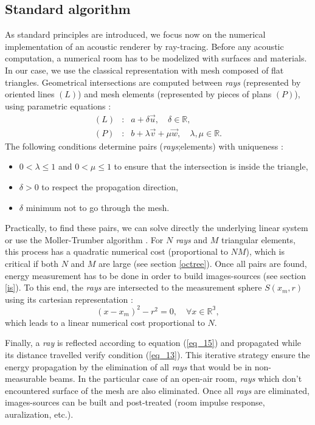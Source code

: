 \documentclass[AMA,STIX1COL]{WileyNJD-v2}
\begin{document}
\subsection{Standard algorithm}
As standard principles are introduced, we focus now on the numerical implementation of an acoustic renderer by ray-tracing. Before any acoustic computation, a numerical room has to be modelized with surfaces and materials. In our case, we use the classical representation with mesh composed of flat triangles. Geometrical intersections are computed between \textit{rays} (represented by oriented lines $(L)$) and mesh elements (represented by pieces of plans $(P)$), using parametric equations :
\begin{eqnarray}
(L) &:& a + \delta \overrightarrow{u}, \quad \delta \in \mathbb{R},  \\
(P) &:& b + \lambda \overrightarrow{v} + \mu \overrightarrow{w}, \quad \lambda, \mu \in \mathbb{R}.
\label{eq_20}
\end{eqnarray}    
The following conditions determine pairs (\textit{rays};elements)  with uniqueness : 
\begin{itemize}
\item $0 < \lambda \leq 1$ and $0 < \mu \leq 1$ to ensure that the intersection is inside the triangle,
\item $\delta > 0$ to respect the propagation direction,
\item $\delta$ minimum not to go through the mesh.
\end{itemize}
Practically, to find these pairs, we can solve directly the underlying linear system or use the Moller-Trumber algorithm \cite{moller}. For $N$ \textit{rays} and $M$ triangular elements, this process has a quadratic numerical cost (proportional to $NM$), which is critical if both $N$ and $M$ are large (see section \ref{octree}). Once all pairs are found, energy measurement has to be done in order to build images-sources (see section \ref{is}). To this end, the \textit{rays} are intersected to the measurement sphere $S(x_m, r)$ using its cartesian representation :
\begin{equation}
(x-x_m)^2 - r^2 = 0, \quad \forall x \in  \mathbb{R^3},
\end{equation} 
which leads to a linear numerical cost proportional to $N$.


Finally, a \textit{ray} is reflected according to equation (\ref{eq_15}) and propagated while its distance travelled verify condition (\ref{eq_13}). This iterative strategy ensure the energy propagation by the elimination of all \textit{rays} that would be in non-measurable beams. In the particular case of an open-air room, \textit{rays} which don't encountered surface of the mesh are also eliminated. Once all \textit{rays} are eliminated, images-sources can be built and post-treated (room impulse response, auralization, etc.).
\end{document}
